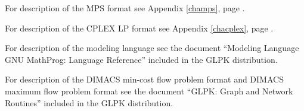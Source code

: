 \bigskip

\noindent
For description of the MPS format see Appendix \ref{champs},
page \pageref{champs}.

\bigskip

\noindent
For description of the CPLEX LP format see Appendix \ref{chacplex},
page \pageref{chacplex}.

\bigskip

\noindent
For description of the modeling language see the document ``Modeling
Language GNU MathProg: Language Reference'' included in the GLPK
distribution.

\bigskip

\noindent
For description of the DIMACS min-cost flow problem format and DIMACS
maximum flow problem format see the document ``GLPK: Graph and Network
Routines'' included in the GLPK distribution.

